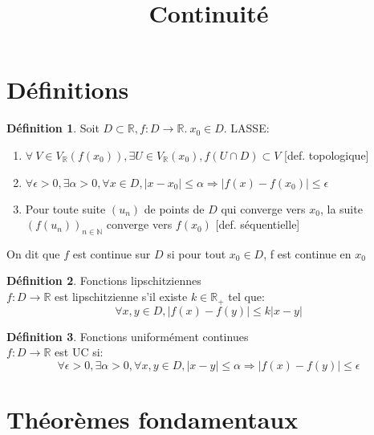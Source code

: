 \documentclass[fleqn]{article}
\title{Continuit\'e}
\date{}
\theoremstyle{definition} \newtheorem*{defi}{D\'efinition}
\theoremstyle{definition} \newtheorem*{theo}{Th\'eor\`eme}
\theoremstyle{definition} \newtheorem*{coro}{Corollaire}
\theoremstyle{remark} \newtheorem*{rqs}{Remarques}
\begin{document}
\maketitle

\section{D\'efinitions}
\begin{defi}
	Soit $D \subset \mathbb{R}, f:D \rightarrow \mathbb{R}.\ x_0 \in D$. LASSE:
	\begin{enumerate}
		\item $\forall\ V \in V_\mathbb{R}(f(x_0)), \exists U \in V_\mathbb{R}(x_0), f(U \cap D) \subset V$ [def. topologique]
		\item $\forall \epsilon>0, \exists \alpha > 0, \forall x \in D, |x-x_0| \leq \alpha \Rightarrow |f(x) - f(x_0)| \leq \epsilon$
		\item Pour toute suite $(u_n)$ de points de $D$ qui converge vers $x_0$, la suite $(f(u_n))_{n\in\mathbb{N}}$ converge vers $f(x_0)$
		[def. s\'equentielle]
	\end{enumerate}
	On dit que $f$ est continue sur $D$ si pour tout $x_0 \in D$, f est continue en $x_0$
\end{defi}

\begin{defi} Fonctions lipschitziennes \\
	$f:D \rightarrow \mathbb{R}$ est lipschitzienne s'il existe $k \in \mathbb{R}_+$ tel que:
	\[\forall x,y \in D, |f(x) - f(y)| \leq k|x-y|\]
\end{defi}
\begin{defi} Fonctions uniform\'ement continues \\
	$f:D \rightarrow \mathbb{R}$ est UC si:
	\[\forall \epsilon >0, \exists \alpha>0, \forall x,y \in D, |x-y| \leq \alpha \Rightarrow |f(x) - f(y)| \leq \epsilon\]
\end{defi}

\section{Th\'eor\`emes fondamentaux}
\end{document}
